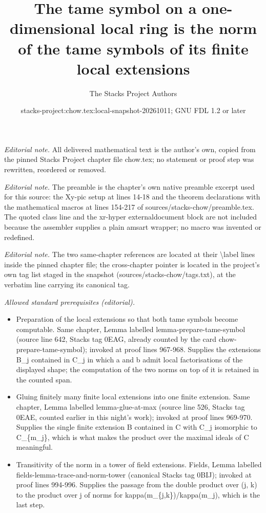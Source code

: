 \documentclass[10pt,a4paper]{amsart}
\title{The tame symbol on a one-dimensional local ring is the norm of the tame symbols of its finite local extensions}
\author{The Stacks Project Authors}
\date{stacks-project:chow.tex:local-snapshot-20261011; GNU FDL 1.2 or later}
\theoremstyle{plain}
\theoremstyle{definition}
\theoremstyle{remark}
\numberwithin{equation}{subsection}
\begin{document}
\maketitle
\noindent\textit{Editorial note.} All delivered mathematical text is the author's own, copied from the pinned Stacks Project chapter file chow.tex; no statement or proof step was rewritten, reordered or removed.\par\medskip
\noindent\textit{Editorial note.} The preamble is the chapter's own native preamble excerpt used for this source: the Xy-pic setup at lines 14-18 and the theorem declarations with the mathematical macros at lines 154-217 of sources/stacks-chow/preamble.tex. The quoted class line and the xr-hyper externaldocument block are not included because the assembler supplies a plain amsart wrapper; no macro was invented or redefined.\par\medskip
\noindent\textit{Editorial note.} The two same-chapter references are located at their \textbackslash{}label lines inside the pinned chapter file; the cross-chapter pointer is located in the project's own tag list staged in the snapshot (sources/stacks-chow/tags.txt), at the verbatim line carrying its canonical tag.\par\medskip
\noindent\textit{Allowed standard prerequisites (editorial).}\begin{itemize}
\item Preparation of the local extensions so that both tame symbols become computable. Same chapter, Lemma labelled lemma-prepare-tame-symbol (source line 642, Stacks tag 0EAG, already counted by the card chow-prepare-tame-symbol); invoked at proof lines 967-968. Supplies the extensions B\_j contained in C\_j in which a and b admit local factorisations of the displayed shape; the computation of the two norms on top of it is retained in the counted span.
\item Gluing finitely many finite local extensions into one finite extension. Same chapter, Lemma labelled lemma-glue-at-max (source line 526, Stacks tag 0EAE, counted earlier in this night's work); invoked at proof lines 969-970. Supplies the single finite extension B contained in C with C\_j isomorphic to C\_\{m\_j\}, which is what makes the product over the maximal ideals of C meaningful.
\item Transitivity of the norm in a tower of field extensions. Fields, Lemma labelled fields-lemma-trace-and-norm-tower (canonical Stacks tag 0BIJ); invoked at proof lines 994-996. Supplies the passage from the double product over (j, k) to the product over j of norms for kappa(m\_\{j,k\})/kappa(m\_j), which is the last step.
\end{itemize}\medskip
\end{document}
